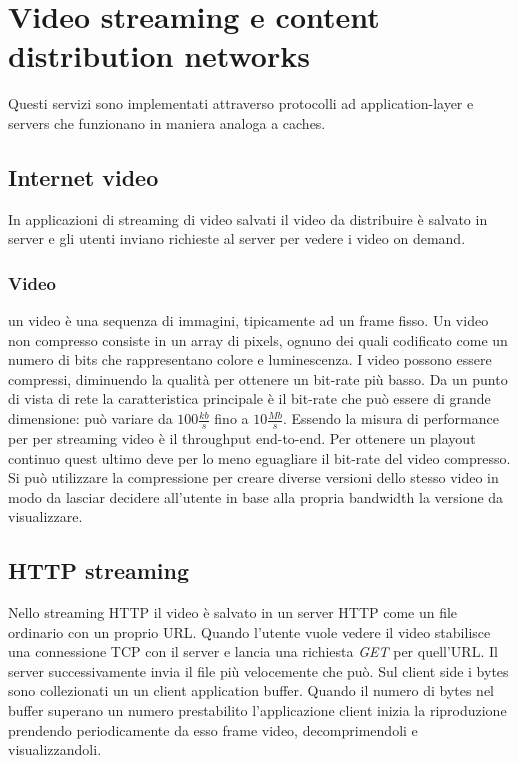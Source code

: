 \section{Video streaming e content distribution networks}
Questi servizi sono implementati attraverso protocolli ad application-layer e servers che funzionano in maniera analoga a caches.
\subsection{Internet video}
In applicazioni di streaming di video salvati il video da distribuire \`e salvato in server e gli utenti inviano richieste al server per vedere i video on
demand. 
\subsubsection{Video}
un video \`e una sequenza di immagini, tipicamente ad un frame fisso. Un video non compresso consiste in un array di pixels, ognuno dei quali codificato 
come un numero di bits che rappresentano colore e luminescenza. I video possono essere compressi, diminuendo la qualit\`a per ottenere un bit-rate pi\`u 
basso. Da un punto di vista di rete la caratteristica principale \`e il bit-rate che pu\`o essere di grande dimensione: pu\`o variare da $100\frac{kb}{s}$
fino a $10\frac{Mb}{s}$. Essendo la misura di performance per per streaming video \`e il throughput end-to-end. Per ottenere un playout continuo quest 
ultimo deve per lo meno eguagliare il bit-rate del video compresso. Si pu\`o utilizzare la compressione per creare diverse versioni dello stesso video in
modo da lasciar decidere all'utente in base alla propria bandwidth la versione da visualizzare. 
\subsection{HTTP streaming}
Nello streaming HTTP il video \`e salvato in un server HTTP come un file ordinario con un proprio URL. Quando l'utente vuole vedere il video stabilisce una
connessione TCP con il server e lancia una richiesta \emph{GET} per quell'URL. Il server successivamente invia il file pi\`u velocemente che pu\`o. Sul 
client side i bytes sono collezionati un un client application buffer. Quando il numero di bytes nel buffer superano un numero prestabilito l'applicazione
client inizia la riproduzione prendendo periodicamente da esso frame video, decomprimendoli e visualizzandoli. 
